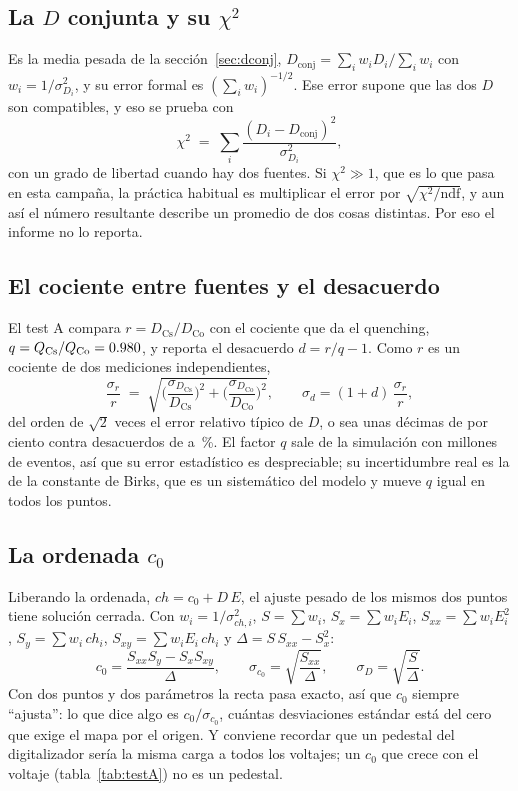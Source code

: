 \documentclass[11pt,a4paper]{article}
\begin{document}
\subsection{La $D$ conjunta y su $\chi^2$}

Es la media pesada de la sección~\ref{sec:dconj},
$D_{\text{conj}} = \sum_i w_i D_i/\sum_i w_i$ con $w_i = 1/\sigma_{D_i}^2$, y
su error formal es $(\sum_i w_i)^{-1/2}$. Ese error supone que las dos $D$ son
compatibles, y eso se prueba con
\[
   \chi^2 \;=\; \sum_i \frac{(D_i - D_{\text{conj}})^2}{\sigma_{D_i}^2},
\]
con un grado de libertad cuando hay dos fuentes. Si $\chi^2 \gg 1$, que es lo
que pasa en esta campaña, la práctica habitual es multiplicar el error por
$\sqrt{\chi^2/\text{ndf}}$, y aun así el número resultante describe un
promedio de dos cosas distintas. Por eso el informe no lo reporta.

\subsection{El cociente entre fuentes y el desacuerdo}

El test A compara $r = D_{\text{Cs}}/D_{\text{Co}}$ con el cociente que da el
quenching, $q = Q_{\text{Cs}}/Q_{\text{Co}} = 0.980$, y reporta el
desacuerdo $d = r/q - 1$. Como $r$ es un cociente de dos mediciones
independientes,
\[
   \frac{\sigma_r}{r} \;=\; \sqrt{\Big(\frac{\sigma_{D_{\text{Cs}}}}{D_{\text{Cs}}}\Big)^2
   + \Big(\frac{\sigma_{D_{\text{Co}}}}{D_{\text{Co}}}\Big)^2},
   \qquad \sigma_d = (1+d)\,\frac{\sigma_r}{r},
\]
del orden de $\sqrt2$ veces el error relativo típico de $D$, o sea unas
décimas de por ciento contra desacuerdos de \DesacMin{} a \DesacMax\,\%. El
factor $q$ sale de la simulación con millones de eventos, así que su error
estadístico es despreciable; su incertidumbre real es la de la constante de
Birks, que es un sistemático del modelo y mueve $q$ igual en todos los
puntos.

\subsection{La ordenada $c_0$}

Liberando la ordenada, $ch = c_0 + D\,E$, el ajuste pesado de los mismos dos
puntos tiene solución cerrada. Con $w_i = 1/\sigma_{ch,i}^2$,
$S = \sum w_i$, $S_x = \sum w_iE_i$, $S_{xx} = \sum w_iE_i^2$,
$S_y = \sum w_i\,ch_i$, $S_{xy} = \sum w_iE_i\,ch_i$ y
$\Delta = S\,S_{xx} - S_x^2$:
\[
   c_0 = \frac{S_{xx}S_y - S_xS_{xy}}{\Delta},\qquad
   \sigma_{c_0} = \sqrt{\frac{S_{xx}}{\Delta}},\qquad
   \sigma_{D} = \sqrt{\frac{S}{\Delta}} .
\]
Con dos puntos y dos parámetros la recta pasa exacto, así que $c_0$ siempre
``ajusta'': lo que dice algo es $c_0/\sigma_{c_0}$, cuántas desviaciones
estándar está del cero que exige el mapa por el origen. Y conviene recordar
que un pedestal del digitalizador sería la misma carga a todos los voltajes;
un $c_0$ que crece con el voltaje (tabla~\ref{tab:testA}) no es un pedestal.
\end{document}
